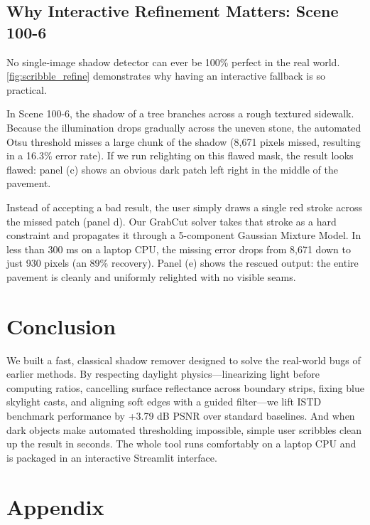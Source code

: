 \documentclass[10pt,twocolumn,letterpaper]{article}
\begin{document}
\subsection{Why Interactive Refinement Matters: Scene 100-6}
No single-image shadow detector can ever be 100\% perfect in the real world. \cref{fig:scribble_refine} demonstrates why having an interactive fallback is so practical.

In Scene 100-6, the shadow of a tree branches across a rough textured sidewalk. Because the illumination drops gradually across the uneven stone, the automated Otsu threshold misses a large chunk of the shadow (8,671 pixels missed, resulting in a 16.3\% error rate). If we run relighting on this flawed mask, the result looks flawed: panel (c) shows an obvious dark patch left right in the middle of the pavement.

Instead of accepting a bad result, the user simply draws a single red stroke across the missed patch (panel d). Our GrabCut solver takes that stroke as a hard constraint and propagates it through a 5-component Gaussian Mixture Model. In less than 300 ms on a laptop CPU, the missing error drops from 8,671 down to just 930 pixels (an 89\% recovery). Panel (e) shows the rescued output: the entire pavement is cleanly and uniformly relighted with no visible seams.

\section{Conclusion}
\label{sec:conclusion}
We built a fast, classical shadow remover designed to solve the real-world bugs of earlier methods. By respecting daylight physics—linearizing light before computing ratios, cancelling surface reflectance across boundary strips, fixing blue skylight casts, and aligning soft edges with a guided filter—we lift ISTD benchmark performance by +3.79 dB PSNR over standard baselines. And when dark objects make automated thresholding impossible, simple user scribbles clean up the result in seconds. The whole tool runs comfortably on a laptop CPU and is packaged in an interactive Streamlit interface.

{\small


}

\clearpage
\appendix
\section*{Appendix}
\label{sec:appendix}
\end{document}
